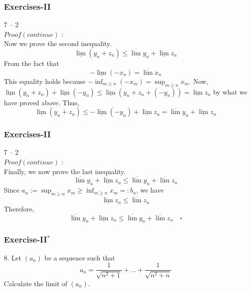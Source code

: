 \documentclass[12pt, t]{beamer}
\begin{document}
\begin{frame}
    \frametitle{Exercises-II}
7 -- 2\\
$Proof(continue)$ : \\
\hspace{1em} Now we prove the second inequality.
\begin{equation*}
    \underline{\lim} (y_n+z_n)\leq\overline{\lim}y_n+\underline{\lim}z_n
\end{equation*}
\hspace{1em} From the fact that 
\begin{equation*}
    -\underline{\lim}(-x_n)=\overline{\lim}x_n
\end{equation*}
\hspace{1em} This equality holds because $-\inf_{m\geq n}(-x_m)=\sup_{m\geq n}x_m$. Now, 
$\underline{\lim}(y_n+z_n)+\underline{\lim}(-y_n)\leq \underline{\lim}(y_n+z_n+(-y_n))=\underline{\lim}z_n$ 
by what we have proved above. Thus, 
\begin{equation*}
    \underline{\lim}(y_n+z_n)\leq -\underline{\lim}(-y_n)+\underline{\lim}z_n=\overline{\lim}y_n+\underline{\lim}z_n
\end{equation*}

\end{frame}


\begin{frame}
    \frametitle{Exercises-II}
7 -- 2\\
$Proof(continue)$ : \\
\hspace{1em} Finally, we now prove the last inequality.
\begin{equation*}
    \overline{\lim}y_n+\underline{\lim}z_n\leq\overline{\lim}y_n+\overline{\lim}z_n
\end{equation*}
\hspace{1em} Since $a_n:=\sup_{m\geq n}x_m\geq \inf_{m\geq n}x_m=:b_n$, we have
\begin{equation*}
    \underline{\lim}z_n\leq \overline{\lim}z_n
\end{equation*}
\hspace{1em} Therefore, 
\begin{equation*}
    \overline{\lim}y_n+\underline{\lim}z_n\leq\overline{\lim}y_n+\overline{\lim}z_n \quad \square
\end{equation*}

\end{frame}




\begin{frame}
    \frametitle{Exercise-II$^*$}
8. Let $(a_n)$ be a sequence such that 
\begin{equation*}
    a_n=\frac{1}{\sqrt{n^2+1}}+\dots+\frac{1}{\sqrt{n^2+n}}
\end{equation*}
Calculate the limit of $(a_n)$.
\end{frame}
\end{document}
